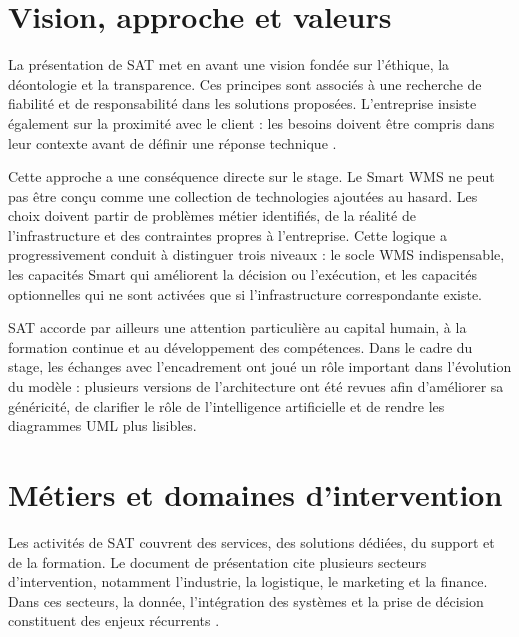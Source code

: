 
\section{Vision, approche et valeurs}

\label{sec:1.2}

La présentation de SAT met en avant une vision fondée sur l’éthique, la déontologie et la transparence. Ces principes sont associés à une recherche de fiabilité et de responsabilité dans les solutions proposées. L’entreprise insiste également sur la proximité avec le client : les besoins doivent être compris dans leur contexte avant de définir une réponse technique \cite{ref1}.


Cette approche a une conséquence directe sur le stage. Le Smart WMS ne peut pas être conçu comme une collection de technologies ajoutées au hasard. Les choix doivent partir de problèmes métier identifiés, de la réalité de l’infrastructure et des contraintes propres à l’entreprise. Cette logique a progressivement conduit à distinguer trois niveaux : le socle WMS indispensable, les capacités Smart qui améliorent la décision ou l’exécution, et les capacités optionnelles qui ne sont activées que si l’infrastructure correspondante existe.


SAT accorde par ailleurs une attention particulière au capital humain, à la formation continue et au développement des compétences. Dans le cadre du stage, les échanges avec l’encadrement ont joué un rôle important dans l’évolution du modèle : plusieurs versions de l’architecture ont été revues afin d’améliorer sa généricité, de clarifier le rôle de l’intelligence artificielle et de rendre les diagrammes UML plus lisibles.



\section{Métiers et domaines d’intervention}

\label{sec:1.3}

Les activités de SAT couvrent des services, des solutions dédiées, du support et de la formation. Le document de présentation cite plusieurs secteurs d’intervention, notamment l’industrie, la logistique, le marketing et la finance. Dans ces secteurs, la donnée, l’intégration des systèmes et la prise de décision constituent des enjeux récurrents \cite{ref1}.


